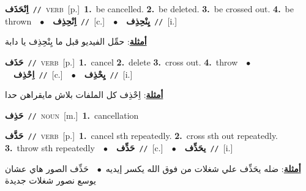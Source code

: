 \documentclass[10pt,a4paper,twoside]{article} %
\begin{document}
\begin{multicols}{2}
{\setlength\topsep{0pt}\textbf{\foreignlanguage{arabic}{اِنْحَذَف}}\ {\color{gray}\texttt{//}\color{black}}\ \textsc{verb}\ [p.]\ \textbf{1.}~be cancelled.  \textbf{2.}~be deleted.  \textbf{3.}~be crossed out.  \textbf{4.}~be thrown\ \ $\bullet$\ \ \setlength\topsep{0pt}\textbf{\foreignlanguage{arabic}{اِنْحِذِف}}\ {\color{gray}\texttt{//}\color{black}}\ [c.]\ \ $\bullet$\ \ \setlength\topsep{0pt}\textbf{\foreignlanguage{arabic}{يِنْحِذِف}}\ {\color{gray}\texttt{//}\color{black}}\ [i.]\  \begin{flushright}\color{gray}\foreignlanguage{arabic}{\textbf{\underline{\foreignlanguage{arabic}{أمثلة}}}: حمِّل الفيديو قبل ما يِنْحِذِف يا دابة}\end{flushright}\color{black}} \vspace{2mm}

{\setlength\topsep{0pt}\textbf{\foreignlanguage{arabic}{حَذَف}}\ {\color{gray}\texttt{//}\color{black}}\ \textsc{verb}\ [p.]\ \textbf{1.}~cancel  \textbf{2.}~delete  \textbf{3.}~cross out.  \textbf{4.}~throw\ \ $\bullet$\ \ \setlength\topsep{0pt}\textbf{\foreignlanguage{arabic}{اِحْذِف}}\ {\color{gray}\texttt{//}\color{black}}\ [c.]\ \ $\bullet$\ \ \setlength\topsep{0pt}\textbf{\foreignlanguage{arabic}{يِحْذِف}}\ {\color{gray}\texttt{//}\color{black}}\ [i.]\  \begin{flushright}\color{gray}\foreignlanguage{arabic}{\textbf{\underline{\foreignlanguage{arabic}{أمثلة}}}: اِحْذِف كل الملفات بلاش مايقراهن حدا}\end{flushright}\color{black}} \vspace{2mm}

{\setlength\topsep{0pt}\textbf{\foreignlanguage{arabic}{حَذِف}}\ {\color{gray}\texttt{//}\color{black}}\ \textsc{noun}\ [m.]\ \textbf{1.}~cancellation\ } \vspace{2mm}

{\setlength\topsep{0pt}\textbf{\foreignlanguage{arabic}{حَذَّف}}\ {\color{gray}\texttt{//}\color{black}}\ \textsc{verb}\ [p.]\ \textbf{1.}~cancel sth repeatedly.  \textbf{2.}~cross sth out repeatedly.  \textbf{3.}~throw sth repeatedly\ \ $\bullet$\ \ \setlength\topsep{0pt}\textbf{\foreignlanguage{arabic}{حَذِّف}}\ {\color{gray}\texttt{//}\color{black}}\ [c.]\ \ $\bullet$\ \ \setlength\topsep{0pt}\textbf{\foreignlanguage{arabic}{يحَذِّف}}\ {\color{gray}\texttt{//}\color{black}}\ [i.]\  \begin{flushright}\color{gray}\foreignlanguage{arabic}{\textbf{\underline{\foreignlanguage{arabic}{أمثلة}}}: ضله يحَذِّف علي شغلات من فوق الله يكسر إيديه\ $\bullet$\ \  حَذِّف الصور هاي عشان يوسع نصور شغلات جديدة}\end{flushright}\color{black}} \vspace{2mm}


\end{multicols}
\end{document}
